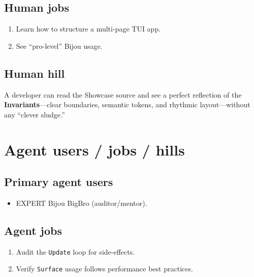 \subsection{Human jobs}\label{record-252-human-jobs}

\begin{enumerate}
\def\labelenumi{\arabic{enumi}.}
\tightlist
\item
  Learn how to structure a multi-page TUI app.
\item
  See ``pro-level'' Bijou usage.
\end{enumerate}

\subsection{Human hill}\label{record-252-human-hill}

A developer can read the Showcase source and see a perfect reflection of the \textbf{Invariants}---clear boundaries, semantic tokens, and rhythmic layout---without any ``clever sludge.''

\section{Agent users / jobs / hills}\label{record-252-agent-users-jobs-hills}

\subsection{Primary agent users}\label{record-252-primary-agent-users}

\begin{itemize}
\tightlist
\item
  EXPERT Bijou BigBro (auditor/mentor).
\end{itemize}

\subsection{Agent jobs}\label{record-252-agent-jobs}

\begin{enumerate}
\def\labelenumi{\arabic{enumi}.}
\tightlist
\item
  Audit the \texttt{U\allowbreak{}p\allowbreak{}d\allowbreak{}a\allowbreak{}t\allowbreak{}e} loop for side-effects.
\item
  Verify \texttt{S\allowbreak{}u\allowbreak{}r\allowbreak{}f\allowbreak{}a\allowbreak{}c\allowbreak{}e} usage follows performance best practices.
\end{enumerate}

